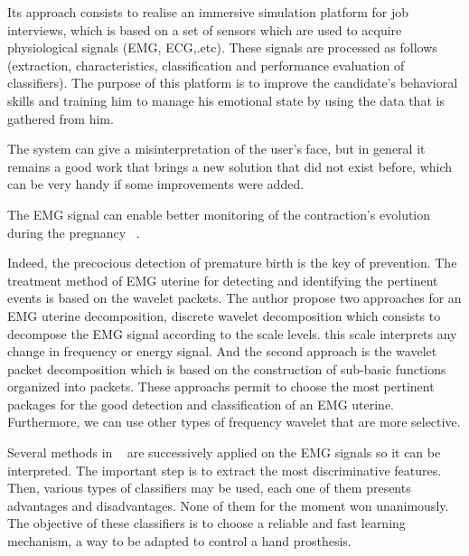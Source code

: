 \documentclass[conference]{IEEEtran}
\begin{document}
Its approach consists to realise an immersive simulation platform for job interviews, which is based on a set of sensors which are used to acquire physiological signals (EMG, ECG,.etc). These signals are processed as follows (extraction, characteristics, classification and performance evaluation of classifiers). The purpose of this platform is to improve the candidate's behavioral skills and training him to manage his emotional state by using the data that is gathered from him.\par

The system can give a misinterpretation of the user's face, but in general it remains a good work that brings a new solution that did not exist before, which can be very handy if some improvements were added.\par
The EMG signal can enable better monitoring of the contraction's evolution during the pregnancy~\cite{Chendab} .\par Indeed, the precocious detection of premature birth is the key of prevention. The treatment method of EMG uterine for detecting and identifying the pertinent events is based on the wavelet packets.
The author propose two approaches for an EMG uterine decomposition, discrete wavelet decomposition which consists to decompose the EMG signal according to the scale levels. this scale interprets any change in frequency or energy signal. And the second approach is the wavelet packet decomposition which is based on the construction of sub-basic functions organized into packets.
These approachs permit to choose the most pertinent packages for the good detection and classification of an EMG uterine. Furthermore, we can use other types of frequency wavelet that are more selective.\par
Several methods in ~\cite{huet} are successively applied on the EMG signals so it can be interpreted. The important step is to extract the most discriminative features. Then, various types of classifiers may be used, each one of them presents advantages and disadvantages. None of them for the moment won unanimously. The objective of these classifiers is to choose a reliable and fast learning mechanism, a way to be adapted to control a hand prosthesis.\par
\end{document}

